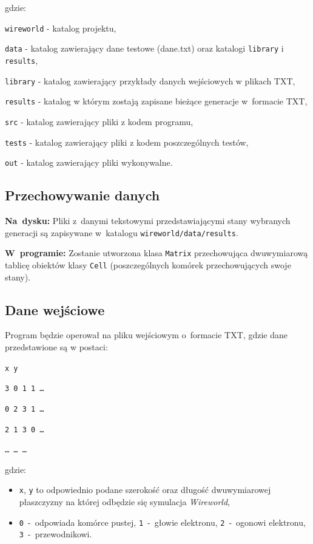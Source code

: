 \documentclass[a4paper,12pt,oneside]{article}
\begin{document}
gdzie: \par \verb+wireworld+ - katalog projektu,
\par \verb+data+ - katalog zawierający dane testowe (dane.txt) oraz katalogi \verb+library+ i \verb+results+,
\par \verb+library+ - katalog zawierający przykłady danych wejściowych w plikach TXT,
\par \verb+results+ - katalog w którym zostają zapisane bieżące generacje w~formacie TXT,
\par \verb+src+ - katalog zawierający pliki z kodem programu,
\par \verb+tests+ - katalog zawierający pliki z kodem poszczególnych testów,
\par \verb+out+ - katalog zawierający pliki wykonywalne.

\subsection{Przechowywanie danych}
\textbf{Na~dysku:}
Pliki z~danymi tekstowymi przedstawiającymi stany wybranych generacji są zapisywane w~katalogu \verb+wireworld/data/results+.
\newline
\par \textbf{W~programie:}
Zostanie utworzona klasa \verb+Matrix+ przechowująca dwuwymiarową tablicę obiektów klasy \verb+Cell+ (poszczególnych komórek przechowujących swoje stany).


\subsection{Dane wejściowe}

Program będzie operował na pliku wejściowym o~formacie TXT, gdzie dane przedstawione są w postaci:\newline
\par \verb+x y+
\par \verb+3 0 1 1 …+
\par \verb+0 2 3 1 …+
\par \verb+2 1 3 0 …+
\par \verb+… … … +\newline
\par gdzie:
\begin{itemize}
\item \verb+x+, \verb+y+ to odpowiednio podane szerokość oraz długość dwuwymiarowej płaszczyzny na której odbędzie się symulacja \textit{Wireworld},
\item \verb+0+~-~odpowiada komórce pustej, \verb+1+~-~głowie elektronu, \verb+2+~-~ogonowi elektronu, \verb+3+~-~przewodnikowi.
\end{itemize}
\end{document}
